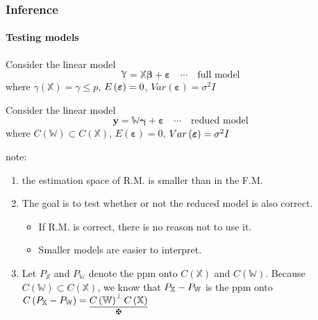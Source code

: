 \documentclass{article}
\begin{document}
\subsubsection{Inference}

\paragraph{Testing models}

\bigskip

Consider the linear model 
\begin{equation*}
\mathbb{Y}=\mathbb{X}\boldsymbol{\beta }+\boldsymbol{\varepsilon \quad }%
\cdots \boldsymbol{\quad }\text{full model}
\end{equation*}%
where $\gamma \left( \mathbb{X}\right) =\gamma \leq p$, $E\left( \boldsymbol{%
\varepsilon }\right) =0$, $Var\left( \boldsymbol{\varepsilon }\right)
=\sigma ^{2}I$

\bigskip

Consider the linear model%
\begin{equation*}
\boldsymbol{y}=\mathbb{W}\boldsymbol{\gamma }+\boldsymbol{\varepsilon \quad }%
\cdots \boldsymbol{\quad }\text{redued model}
\end{equation*}%
where $C\left( \mathbb{W}\right) \subset C\left( \mathbb{X}\right) $, $%
E\left( \boldsymbol{\varepsilon }\right) =0$, $Var\left( \boldsymbol{%
\varepsilon }\right) =\sigma ^{2}I$

\bigskip

note:

\begin{enumerate}
\item the estimation space of R.M. is smaller than in the F.M.

\item The goal is to test whether or not the reduced model is also correct.

\begin{itemize}
\item If R.M. is correct, there is no reason not to use it.

\item Smaller models are easier to interpret.
\end{itemize}

\item Let $P_{\mathbb{X}}$ and $P_{\mathbb{W}}$ denote the ppm onto $C\left( 
\mathbb{X}\right) $ and $C\left( \mathbb{W}\right) $. Because $C\left( 
\mathbb{W}\right) \subset C\left( \mathbb{X}\right) $, we know that $P_{%
\mathbb{X}}-P_{\mathbb{W}}$ is the ppm onto $C\left( P_{\mathbb{X}}-P_{%
\mathbb{W}}\right) =\underset{\maltese }{\underline{C\left( \mathbb{W}%
\right) ^{\perp }C\left( \mathbb{X}\right) }}$
\end{enumerate}
\end{document}
